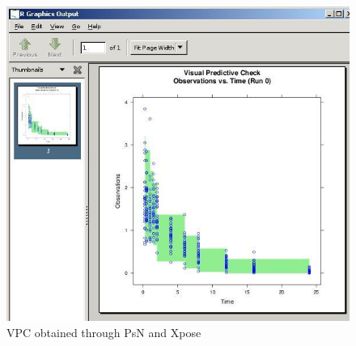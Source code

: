 \begin{figure}[h] \centering
    \includegraphics[scale=.4]{images/vpc_7.jpg}
    \caption{VPC obtained through PsN and Xpose
      \label{fig:Fig7}}
\end{figure}
